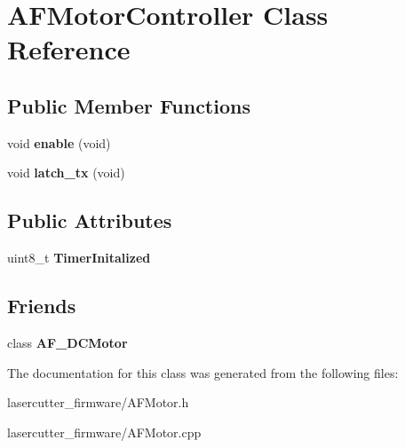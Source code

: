\hypertarget{class_a_f_motor_controller}{}\section{A\+F\+Motor\+Controller Class Reference}
\label{class_a_f_motor_controller}
\subsection*{Public Member Functions}
\begin{DoxyCompactItemize}
\item 
void {\bfseries enable} (void)\hypertarget{class_a_f_motor_controller_af4241ea7f3957d9f252dddb1d891e69f}{}\label{class_a_f_motor_controller_af4241ea7f3957d9f252dddb1d891e69f}

\item 
void {\bfseries latch\+\_\+tx} (void)\hypertarget{class_a_f_motor_controller_a74b92162f025c066f51994651f232bea}{}\label{class_a_f_motor_controller_a74b92162f025c066f51994651f232bea}

\end{DoxyCompactItemize}
\subsection*{Public Attributes}
\begin{DoxyCompactItemize}
\item 
uint8\+\_\+t {\bfseries Timer\+Initalized}\hypertarget{class_a_f_motor_controller_afeb2182680ec02179d4fccb46cba5a22}{}\label{class_a_f_motor_controller_afeb2182680ec02179d4fccb46cba5a22}

\end{DoxyCompactItemize}
\subsection*{Friends}
\begin{DoxyCompactItemize}
\item 
class {\bfseries A\+F\+\_\+\+D\+C\+Motor}\hypertarget{class_a_f_motor_controller_a6a48e8c9a424ccdaea47858f7d043819}{}\label{class_a_f_motor_controller_a6a48e8c9a424ccdaea47858f7d043819}

\end{DoxyCompactItemize}


The documentation for this class was generated from the following files\+:\begin{DoxyCompactItemize}
\item 
lasercutter\+\_\+firmware/A\+F\+Motor.\+h\item 
lasercutter\+\_\+firmware/A\+F\+Motor.\+cpp\end{DoxyCompactItemize}
